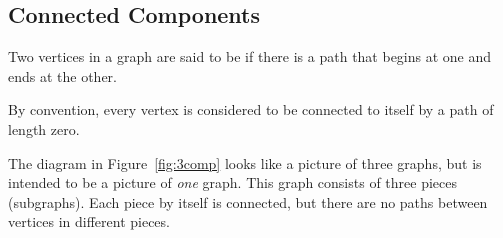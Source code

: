 \subsection{Connected Components}

\begin{definition}
Two vertices in a graph are said to be  if there is a path
that begins at one and ends at the other.
\end{definition}

By convention, every vertex is considered to be connected to itself by a
path of length zero.

The diagram in Figure~\ref{fig:3comp} looks like a picture of three
graphs, but is intended to be a picture of \emph{one} graph.  This graph
consists of three pieces (subgraphs).  Each piece by itself is connected,
but there are no paths between vertices in different pieces.


